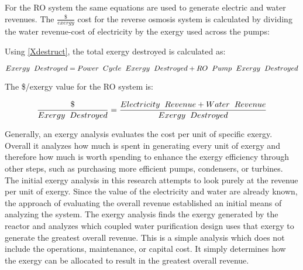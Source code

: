 For the RO system the same equations are used to generate electric and water revenues. The $\frac{\$}{exergy}$ cost for the reverse osmosis system is calculated by dividing the water revenue-cost of electricity by the exergy used across the pumps:

Using \ref{Xdestruct}, the total exergy destroyed is calculated as:

\begin{equation}
Exergy\hspace{.2cm}Destroyed = Power\hspace{.2cm}Cycle\hspace{.2cm}Exergy\hspace{.2cm}Destroyed+RO\hspace{.2cm}Pump\hspace{.2cm}Exergy\hspace{.2cm}Destroyed
\label{Xdestruct}
\end{equation}

The \$/exergy value for the RO system is:

\begin{equation}
\frac{\$}{Exergy\hspace{.2cm}Destroyed}=\frac{Electricity \hspace{.2cm} Revenue+ Water \hspace{.2cm} Revenue}{Exergy\hspace{.2cm}Destroyed}
\end{equation}

Generally, an exergy analysis evaluates the cost per unit of specific exergy.  Overall it analyzes how much is spent in generating every unit of exergy and therefore how much is worth spending to enhance the exergy efficiency through other steps, such as purchasing more efficient pumps, condensers, or turbines.  The initial exergy analysis in this research attempts to look purely at the revenue per unit of exergy.  Since the value of the electricity and water are already known, the approach of evaluating the overall revenue established an initial means of analyzing the system. The exergy analysis finds the exergy generated by the reactor and analyzes which coupled water purification design uses that exergy to generate the greatest overall revenue.  This is a simple analysis which does not include the operations, maintenance, or capital cost.  It simply determines how the exergy can be allocated to result in the greatest overall revenue.

